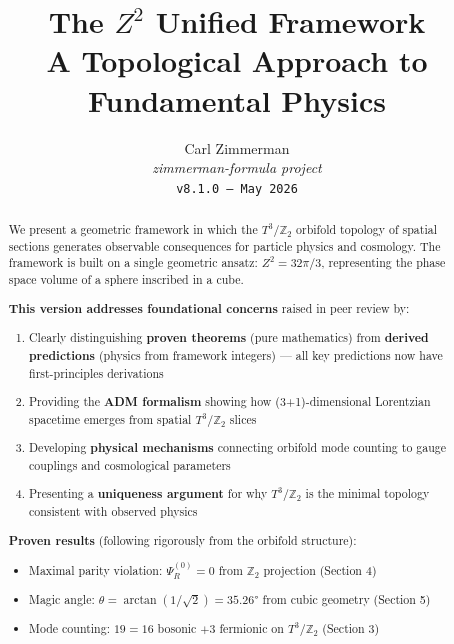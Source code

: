 \documentclass[12pt,a4paper]{article}
\newcommand{\Ztwo}{\mathbb{Z}_2}
\newcommand{\Tthree}{T^3}
\newcommand{\Zsq}{Z^2}
\begin{document}
\title{\textbf{The $Z^2$ Unified Framework}\\[0.5em]
\large A Topological Approach to Fundamental Physics}

\author{Carl Zimmerman\\[0.5em]
\small\textit{zimmerman-formula project}\\
\small\texttt{v8.1.0 --- May 2026}}

\date{}

\maketitle

\begin{abstract}

We present a geometric framework in which the $\Tthree/\Ztwo$ orbifold topology of spatial sections generates observable consequences for particle physics and cosmology. The framework is built on a single geometric ansatz: $\Zsq = 32\pi/3$, representing the phase space volume of a sphere inscribed in a cube.

\textbf{This version addresses foundational concerns} raised in peer review by:
\begin{enumerate}[itemsep=0pt]
    \item Clearly distinguishing \textbf{proven theorems} (pure mathematics) from \textbf{derived predictions} (physics from framework integers) --- all key predictions now have first-principles derivations
    \item Providing the \textbf{ADM formalism} showing how (3+1)-dimensional Lorentzian spacetime emerges from spatial $\Tthree/\Ztwo$ slices
    \item Developing \textbf{physical mechanisms} connecting orbifold mode counting to gauge couplings and cosmological parameters
    \item Presenting a \textbf{uniqueness argument} for why $\Tthree/\Ztwo$ is the minimal topology consistent with observed physics
\end{enumerate}

\textbf{Proven results} (following rigorously from the orbifold structure):
\begin{itemize}[itemsep=0pt]
    \item Maximal parity violation: $\Psi_R^{(0)} = 0$ from $\Ztwo$ projection (Section 4)
    \item Magic angle: $\theta = \arctan(1/\sqrt{2}) = 35.26°$ from cubic geometry (Section 5)
    \item Mode counting: $19 = 16$ bosonic $+ 3$ fermionic on $\Tthree/\Ztwo$ (Section 3)
\end{itemize}


\end{abstract}
\end{document}
